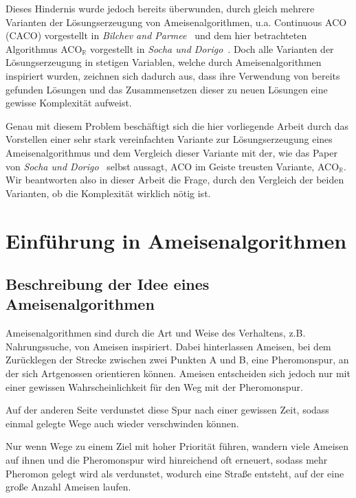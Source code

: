 \documentclass[fontsize=12, a4aper]{scrartcl}
\begin{document}
	Dieses Hindernis wurde jedoch bereits überwunden, durch gleich mehrere Varianten der Lösungserzeugung von Ameisenalgorithmen, u.a. Continuous ACO (CACO) vorgestellt in \textit{Bilchev and Parmee}~\cite{bilchev1995ant} und dem hier betrachteten Algorithmus ACO\(_{\mathbb{R}}\) vorgestellt in \textit{Socha und Dorigo}~\cite{socha2008ant}. Doch alle Varianten der Lösungserzeugung in stetigen Variablen, welche durch Ameisenalgorithmen inspiriert wurden, zeichnen sich dadurch aus, dass ihre Verwendung von bereits gefunden Lösungen und das Zusammensetzen dieser zu neuen Lösungen eine gewisse Komplexität aufweist.\hfill\newline
	
	Genau mit diesem Problem beschäftigt sich die hier vorliegende Arbeit durch das Vorstellen einer sehr stark vereinfachten Variante zur Lösungserzeugung eines Ameisenalgorithmus und dem Vergleich dieser Variante mit der, wie das Paper von \textit{Socha und Dorigo}~\cite{socha2008ant} selbst aussagt, ACO im Geiste treusten Variante, ACO\(_{\mathbb{R}}\). Wir beantworten also in dieser Arbeit die Frage, durch den Vergleich der beiden Varianten, ob die Komplexität wirklich nötig ist.
	
	\newpage
	
	\section{Einführung in Ameisenalgorithmen}
	
	\subsection{Beschreibung der Idee eines Ameisenalgorithmen}

	Ameisenalgorithmen sind durch die Art und Weise des Verhaltens, z.B. Nahrungssuche, von Ameisen inspiriert. Dabei hinterlassen Ameisen, bei dem Zurücklegen der Strecke zwischen zwei Punkten A und B, eine Pheromonspur, an der sich Artgenossen orientieren können. Ameisen entscheiden sich jedoch nur mit einer gewissen Wahrscheinlichkeit für den Weg mit der Pheromonspur.\hfill\newline
	
	Auf der anderen Seite verdunstet diese Spur nach einer gewissen Zeit, sodass einmal gelegte Wege auch wieder verschwinden können.\hfill\newline
	
	Nur wenn Wege zu einem Ziel mit hoher Priorität führen, wandern viele Ameisen auf ihnen und die Pheromonspur wird hinreichend oft erneuert, sodass mehr Pheromon gelegt wird als verdunstet, wodurch eine Straße entsteht, auf der eine große Anzahl Ameisen laufen.\hfill\newline
	
\end{document}
